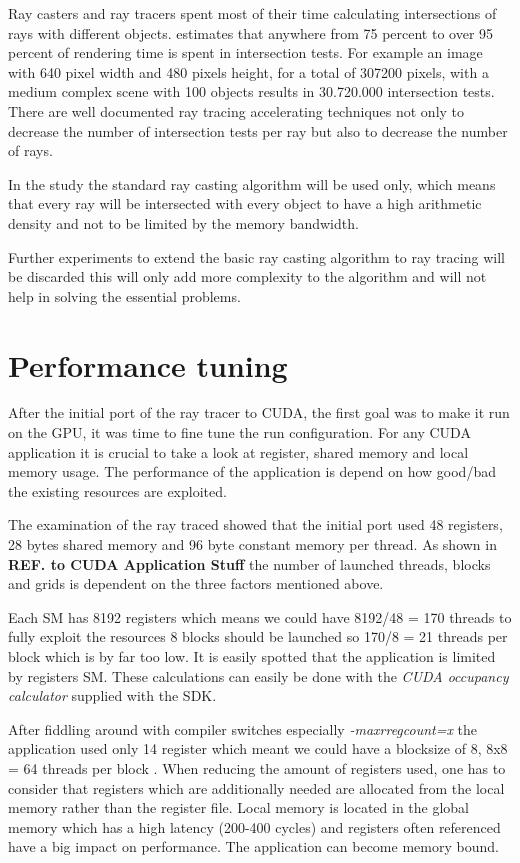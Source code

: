 Ray casters and ray tracers spent most of their time calculating intersections
of rays with different objects. \citeauthor{Whitted80} \citep{Whitted80} estimates
that anywhere from 75 percent to over 95 percent of rendering time is spent in
intersection tests. For example an image with 640 pixel width and 480 pixels
height, for a total of 307200 pixels, with a medium complex scene with 100
objects results in 30.720.000 intersection tests. There are well documented ray
tracing accelerating techniques not only to decrease the number of intersection
tests per ray but also to decrease the number of rays.

In the study the standard ray casting algorithm will be used only, which means
that every ray will be intersected with every object to have a high arithmetic
density and not to be limited by the memory bandwidth.

Further experiments to extend the basic ray casting algorithm to ray tracing 
will be discarded this will only add more complexity to the algorithm and will
not help in solving the essential problems. 

\section{Performance tuning} %
\label{sec:performance_tuning}

After the initial port of the ray tracer to \gls{CUDA}, the first goal was to 
make it run on the \gls{GPU}, it was time to fine tune the run configuration. 
For any \gls{CUDA} application it is crucial to take a look at register, shared 
memory and local memory usage. The performance of the application is depend on
how good/bad the existing resources are exploited.

The examination of the ray traced showed that the initial port used 48
registers, 28 bytes shared memory and 96 byte constant memory per thread. As
shown in \textbf{REF. to \gls{CUDA} Application Stuff} the number of launched threads,
blocks and grids is dependent on the three factors mentioned above.

Each \gls{SM} has 8192 registers which means we could have 8192/48 = 170 threads
to fully exploit the resources 8 blocks should be launched so 170/8 = 21 threads
per block which is by far too low. It is easily spotted that the application is
limited by registers \gls{SM}. These calculations can easily be done with the
\emph{CUDA occupancy calculator} supplied with the SDK.

After fiddling around with compiler switches especially \emph{-maxrregcount=x}
the application used only 14 register which meant we could have a blocksize of
8, 8x8 = 64 threads per block . When reducing the amount of registers used, one
has to consider that registers which are additionally needed are allocated from
the local memory rather than the register file. Local memory is located in the
global memory which has a high latency (200-400 cycles) and registers often
referenced have a big impact on performance. The application can become memory
bound.

